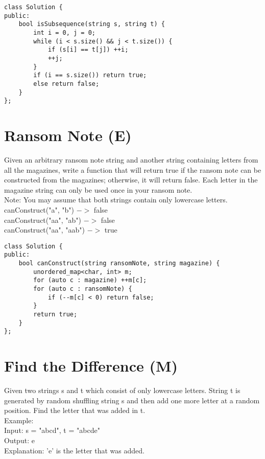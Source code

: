 \begin{lstlisting}
class Solution {
public:
    bool isSubsequence(string s, string t) {
        int i = 0, j = 0;
        while (i < s.size() && j < t.size()) {
            if (s[i] == t[j]) ++i;
            ++j;
        }
        if (i == s.size()) return true;
        else return false;
    }
};
\end{lstlisting}


\section{Ransom Note (E)}
Given an arbitrary ransom note string and another string containing letters from all the magazines, write a function that will return true if the ransom note can be constructed from the magazines; otherwise, it will return false. Each letter in the magazine string can only be used once in your ransom note. \\

Note:
You may assume that both strings contain only lowercase letters.\\

canConstruct("a", "b") $->$ false\\
canConstruct("aa", "ab") $->$ false\\
canConstruct("aa", "aab") $->$ true\\

\begin{lstlisting}
class Solution {
public:
    bool canConstruct(string ransomNote, string magazine) {
        unordered_map<char, int> m;
        for (auto c : magazine) ++m[c];
        for (auto c : ransomNote) {
            if (--m[c] < 0) return false;
        }
        return true;
    }
};
\end{lstlisting}


\section{Find the Difference (M)}
Given two strings s and t which consist of only lowercase letters. String t is generated by random shuffling string s and then add one more letter at a random position. Find the letter that was added in t. \\

Example:\\
Input: s = "abcd", t = "abcde"\\
Output: e\\
Explanation: 'e' is the letter that was added.\\

